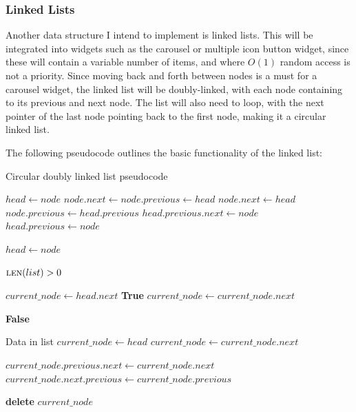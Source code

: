 \documentclass[../main/main.tex]{subfiles}
\begin{document}
\subsubsection{Linked Lists}
Another data structure I intend to implement is linked lists. This will be integrated into widgets such as the carousel or multiple icon button widget, since these will contain a variable number of items, and where $O(1)$ random access is not a priority. Since moving back and forth between nodes is a must for a carousel widget, the linked list will be doubly-linked, with each node containing to its previous and next node. The list will also need to loop, with the next pointer of the last node pointing back to the first node, making it a circular linked list.

The following pseudocode outlines the basic functionality of the linked list:

\begin{algorithm}[H]
\caption{Circular doubly linked list pseudocode}
\begin{algorithmic}
            \State $head \gets node$
            \State $node.next \gets node.previous \gets head$
        \Else
            \State $node.next \gets head$
            \State $node.previous \gets head.previous$
            \State $head.previous.next \gets node$
            \State $head.previous \gets node$

            \bigskip

            \State $head \gets node$
        \EndIf
    \EndFunction

    \bigskip

    \State \Require $\Call{len}{list} > 0$

        \State $current\_node \gets head.next$
                \State \Return \textbf{True}
            \EndIf
            \State $current\_node \gets current\_node.next$
        \EndWhile

        \State \Return \textbf{False}
    \EndFunction

    \bigskip

    \State \Require Data in list
        \State $current\_node \gets head$
            \State $current\_node \gets current\_node.next$
        \EndWhile

        \bigskip

        \State $current\_node.previous.next \gets current\_node.next$
        \State $current\_node.next.previous \gets current\_node.previous$

        \bigskip

        \State \textbf{delete} $current\_node$
    \EndFunction
\end{algorithmic}
\end{algorithm}
\end{document}
